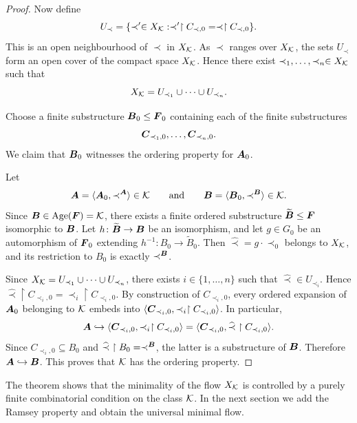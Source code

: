 \begin{proof}
    Now define
    \[
        U_{\prec}
        =
        \{\prec'\in X_{\mathcal{K}} \mathrel{:} \prec'\restriction C_{\prec,0}=\prec\restriction C_{\prec,0}\}.
    \]
    This is an open neighbourhood of \(\prec\) in \(X_{\mathcal{K}}\). As \(\prec\) ranges over \(X_{\mathcal{K}}\), the sets \(U_{\prec}\) form an open cover of the compact space \(X_{\mathcal{K}}\). Hence there exist
    \(\prec_1,\dots,\prec_n\in X_{\mathcal{K}}\)
    such that
    \[
        X_{\mathcal{K}}=U_{\prec_1}\cup\cdots\cup U_{\prec_n}.
    \]

    Choose a finite substructure \(\boldsymbol{B}_0\leq \boldsymbol{F}_0\) containing each of the
    finite substructures
    \[
        \boldsymbol{C}_{\prec_1,0},\dots,\boldsymbol{C}_{\prec_n,0}.
    \]
    We claim that \(\boldsymbol{B}_0\) witnesses the ordering property for \(\boldsymbol{A}_0\).

    Let
    \[
        \boldsymbol{A}=\langle \boldsymbol{A}_0,\prec^{\boldsymbol{A}}\rangle\in\mathcal{K}
        \qquad\text{and}\qquad
        \boldsymbol{B}=\langle \boldsymbol{B}_0,\prec^{\boldsymbol{B}}\rangle\in\mathcal{K}.
    \]
    Since \(\boldsymbol{B}\in\operatorname{Age}(\boldsymbol{F})=\mathcal{K}\), there exists a finite ordered substructure
    \(\widetilde{\boldsymbol{B}}\leq \boldsymbol{F}\) isomorphic to \(\boldsymbol{B}\). Let
    \(h\colon \widetilde{\boldsymbol{B}}\to \boldsymbol{B}\) be an isomorphism, and let
    \(g\in G_0\) be an automorphism of \(\boldsymbol{F}_0\) extending
    \(h^{-1}\colon B_0\to \widetilde{B}_0\). Then
    \(\widehat{\prec}=g\cdot \prec_0\)
    belongs to \(X_{\mathcal{K}}\), and its restriction to \(B_0\) is exactly \(\prec^{\boldsymbol{B}}\).

    Since \(X_{\mathcal{K}}=U_{\prec_1}\cup\cdots\cup U_{\prec_n}\),
    there exists \(i\in\{1,\dots,n\}\) such that
    \(\widehat{\prec}\in U_{\prec_i}\).
    Hence
    \(\widehat{\prec}\restriction C_{\prec_i,0}=\prec_i\restriction C_{\prec_i,0}\).
    By construction of \(C_{\prec_i,0}\), every ordered expansion of \(\boldsymbol{A}_0\) belonging to \(\mathcal{K}\) embeds into
    \(\langle \boldsymbol{C}_{\prec_i,0},\prec_i\restriction C_{\prec_i,0}\rangle\).
    In particular,
    \[
        \boldsymbol{A}\hookrightarrow \langle \boldsymbol{C}_{\prec_i,0},\prec_i\restriction C_{\prec_i,0}\rangle
        =
        \langle \boldsymbol{C}_{\prec_i,0},\widehat{\prec}\restriction C_{\prec_i,0}\rangle.
    \]
    Since \(C_{\prec_i,0}\subseteq B_0\)
    and \(\widehat{\prec}\restriction B_0=\prec^{\boldsymbol{B}}\), the latter is a substructure of \(\boldsymbol{B}\). Therefore
    \(\boldsymbol{A}\hookrightarrow \boldsymbol{B}\).
    This proves that \(\mathcal{K}\) has the ordering property.
\end{proof}
The theorem shows that the minimality of the flow \(X_{\mathcal{K}}\) is controlled by a purely finite combinatorial condition on the class \(\mathcal{K}\). In the next section we add the Ramsey property and obtain the universal minimal flow.

